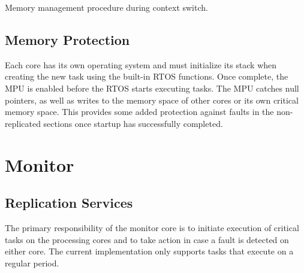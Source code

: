 \begin{algorithm}
	\caption{Memory management procedure during context switch.}
	\label{a:mem-manager}
\end{algorithm}




\subsection{Memory Protection}
\label{s:mem-prot}
	Each core has its own operating system and must initialize its stack when creating the new task using the built-in RTOS functions. 
	Once complete, the MPU is enabled before the RTOS starts executing tasks. 
	The MPU catches null pointers, as well as writes to the memory space of other cores or its own critical memory space. 
	This provides some added protection against faults in the non-replicated sections once startup has successfully completed.

\section{Monitor}
\label{s:mon}
	


\subsection{Replication Services}
	The primary responsibility of the monitor core is to initiate execution of critical tasks on the processing cores and to take action in case a fault is detected on either core. 
	The current implementation only supports tasks that execute on a regular period. 
	
